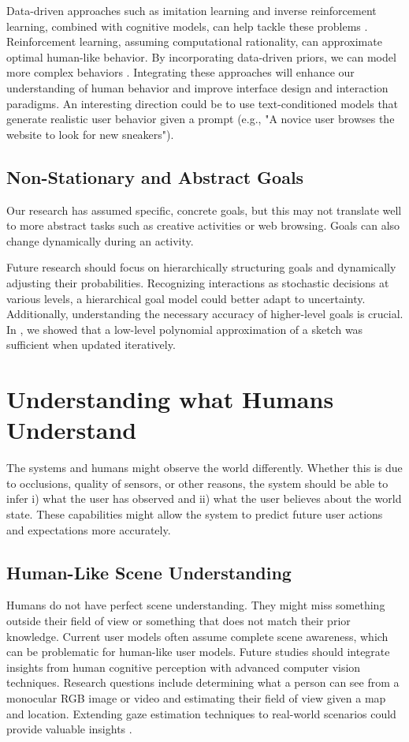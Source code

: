 Data-driven approaches such as imitation learning and inverse reinforcement learning, combined with cognitive models, can help tackle these problems \cite{kwon2020inverse}. Reinforcement learning, assuming computational rationality, can approximate optimal human-like behavior. By incorporating data-driven priors, we can model more complex behaviors \cite{Langerak:2024:rile}. Integrating these approaches will enhance our understanding of human behavior and improve interface design and interaction paradigms. An interesting direction could be to use text-conditioned models that generate realistic user behavior given a prompt (e.g., "A novice user browses the website to look for new sneakers").

\subsection{Non-Stationary and Abstract Goals}
Our research has assumed specific, concrete goals, but this may not translate well to more abstract tasks such as creative activities or web browsing. Goals can also change dynamically during an activity.

Future research should focus on hierarchically structuring goals and dynamically adjusting their probabilities. Recognizing interactions as stochastic decisions at various levels, a hierarchical goal model could better adapt to uncertainty. Additionally, understanding the necessary accuracy of higher-level goals is crucial. In \magpen, we showed that a low-level polynomial approximation of a sketch was sufficient when updated iteratively.

\section{Understanding what Humans Understand}
The systems and humans might observe the world differently. Whether this is due to occlusions, quality of sensors, or other reasons, the system should be able to infer i) what the user has observed and ii) what the user believes about the world state. These capabilities might allow the system to predict future user actions and expectations more accurately.

\subsection{Human-Like Scene Understanding}
Humans do not have perfect scene understanding. They might miss something outside their field of view or something that does not match their prior knowledge. Current user models often assume complete scene awareness, which can be problematic for human-like user models.
Future studies should integrate insights from human cognitive perception with advanced computer vision techniques. Research questions include determining what a person can see from a monocular RGB image or video and estimating their field of view given a map and location. Extending gaze estimation techniques to real-world scenarios could provide valuable insights \cite{akinyelu2020convolutional}.

